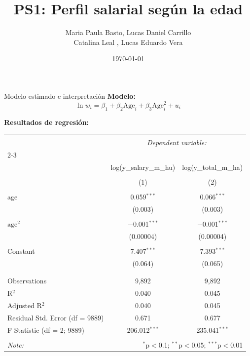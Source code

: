 \documentclass[10pt]{beamer}
\title{PS1: Perfil salarial según la edad}
\author[BD\& ML]{Maria Paula Basto, Lucas Daniel Carrillo\\ Catalina Leal , Lucas Eduardo Vera}
\institute[]{Big Data y Machine Learning \\ Universidad de los Andes}
\date{\today} %
\begin{document}
\frame{\titlepage}


\begin{frame}{Modelo estimado e interpretación}
\textbf{Modelo:}
\begin{equation*}
\ln{w_i} = \beta_1 + \beta_2 \text{Age}_i + \beta_3 \text{Age}_i^2 + u_i
\end{equation*}

\vspace{0.2cm}
\textbf{Resultados de regresión:}
\begin{table}[!htbp] 
\centering 
 
\scriptsize
\begin{tabular}{@{\extracolsep{5pt}}lcc} 
\\[-2.0ex]\hline 
\hline \\[-2.0ex] 
 & \multicolumn{2}{c}{\textit{Dependent variable:}} \\ 
\cline{2-3} 
\\[-1.8ex] & log(y\_salary\_m\_hu) & log(y\_total\_m\_ha) \\ 
\\[-1.8ex] & (1) & (2)\\ 
\hline \\[-2.0ex] 
 age & 0.059$^{***}$ & 0.066$^{***}$ \\ 
  & (0.003) & (0.003) \\ 
  & & \\ 
 $ \text{age}^2 $& $-$0.001$^{***}$ & $-$0.001$^{***}$ \\ 
  & (0.00004) & (0.00004) \\ 
  & & \\ 
 Constant & 7.407$^{***}$ & 7.393$^{***}$ \\ 
  & (0.064) & (0.065) \\ 
  & & \\ 
\hline \\[-2.0ex] 
Observations & 9,892 & 9,892 \\ 
R$^{2}$ & 0.040 & 0.045 \\ 
Adjusted R$^{2}$ & 0.040 & 0.045 \\ 
Residual Std. Error (df = 9889) & 0.671 & 0.677 \\ 
F Statistic (df = 2; 9889) & 206.012$^{***}$ & 235.041$^{***}$ \\ 
\hline 
\hline \\[-2.0ex] 
\textit{Note:}  & \multicolumn{2}{r}{$^{*}$p$<$0.1; $^{**}$p$<$0.05; $^{***}$p$<$0.01} \\ 
\end{tabular} 
\end{table} 

\end{frame}
\end{document}
